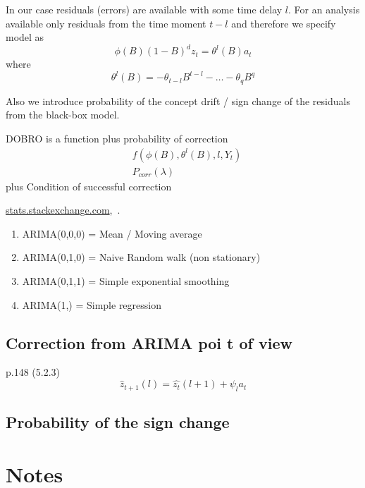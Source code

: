 \documentclass[paper=a4, fontsize=12pt]{article}
\begin{document}
In our case residuals (errors) are available with some time delay  $l$. For an analysis available only residuals from the time moment $t - l$ and therefore we specify model as 
\begin{equation}
\phi(B) (1-B)^d z_t = \theta^l(B) a_t
\end{equation}
where
\begin{equation}
\theta^l (B) = - \theta_{t-l} B^{t-l} - \dots - \theta_q B^q
\end{equation}

Also we introduce probability of the concept drift / sign change of the residuals from the black-box model.

DOBRO is a function plus probability of correction
\begin{align}
&f(\phi (B), \theta^l (B), l, Y_t)\\
&P_{corr}(\lambda)
\label{eq:dobro}
\end{align}
plus
Condition of successful correction

\href{https://stats.stackexchange.com/questions/23864/what-common-forecasting-models-can-be-seen-as-special-cases-of-arima-models}{stats.stackexchange.com},~\cite{Nau}.
\begin{enumerate}
\item ARIMA(0,0,0) = Mean / Moving average
\item ARIMA(0,1,0) = Naive  Random walk (non stationary) 
\item ARIMA(0,1,1) = Simple exponential smoothing
\item ARIMA(1,) = Simple regression 
\end{enumerate}

\subsection{Correction from ARIMA poi t of view}
p.148 (5.2.3)
\begin{equation}
\hat{z}_{t+1} (l) = \hat{z_t}(l+1) + \psi_l a_t
\end{equation}

\subsection{Probability of the sign change}


\section{Notes}
\end{document}
